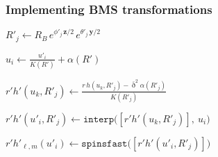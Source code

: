 \documentclass[12pt,xcolor={dvipsnames}]{beamer}
\renewcommand{\vec}{\bm}
\renewcommand{\vec}[1]{\boldsymbol{#1}}
\begin{document}

\begin{frame}
  \frametitle{Implementing BMS transformations}
  \vspace{-0.1in}
  \begin{spacing}{1.75}
    \begin{algorithmic}


      \STATE
      $R'_{j} \gets R_{B}\, e^{\phi'_{j}\, \vec{z}/2}\, e^{\theta'_{j}\,
        \vec{y}/2}$

      \STATE
      $u_{i} \gets \frac{u'_{i}}{K(R')} + \alpha(R')$


      \STATE
      $r' h'(u_{k}, R'_{j}) \gets \frac{r\, h(u_{k}, R'_{j}) -
        \bar{\eth}^{2}\alpha (R'_{j})} {K(R'_{j})}$

      \ENDFOR

      \STATE
      $r'h'(u'_{i}, R'_{j}) \gets \texttt{interp} \big( [r' h'(u_{k},
      R'_{j})],\ u_{i} \big)$

      \ENDFOR

      \STATE
      $r'h'_{\ell, m}(u'_{i}) \gets \texttt{spinsfast} \big(
      [r'h'(u'_{i}, R'_{j})] \big)$

      \ENDFOR
    \end{algorithmic}
  \end{spacing}
\end{frame}
\end{document}
